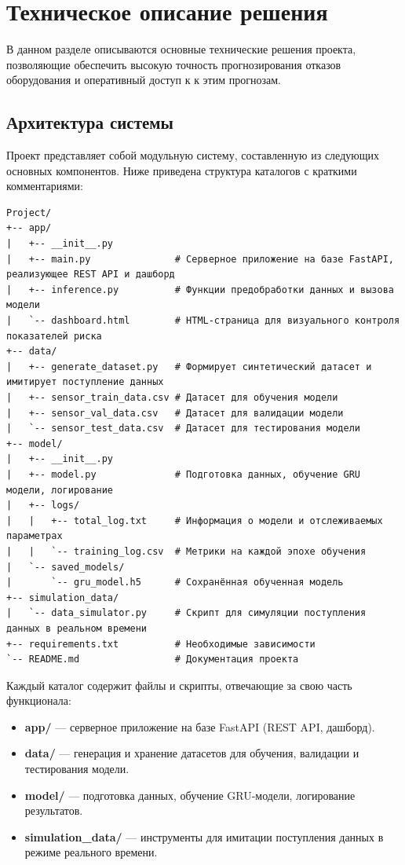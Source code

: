 \documentclass[a4paper,12pt]{article}
\begin{document}
\section{Техническое описание решения}
\begin{flushleft}

В данном разделе описываются основные технические решения проекта, позволяющие обеспечить высокую точность прогнозирования отказов оборудования и оперативный доступ к к этим прогнозам.

\subsection{Архитектура системы}
Проект представляет собой модульную систему, составленную из следующих основных компонентов. Ниже приведена структура каталогов с краткими комментариями:


\begin{lstlisting}
Project/
+-- app/
|   +-- __init__.py
|   +-- main.py               # Серверное приложение на базе FastAPI, реализующее REST API и дашборд
|   +-- inference.py          # Функции предобработки данных и вызова модели
|   `-- dashboard.html        # HTML-страница для визуального контроля показателей риска
+-- data/
|   +-- generate_dataset.py   # Формирует синтетический датасет и имитирует поступление данных
|   +-- sensor_train_data.csv # Датасет для обучения модели
|   +-- sensor_val_data.csv   # Датасет для валидации модели
|   `-- sensor_test_data.csv  # Датасет для тестирования модели
+-- model/
|   +-- __init__.py
|   +-- model.py              # Подготовка данных, обучение GRU модели, логирование
|   +-- logs/
|   |   +-- total_log.txt     # Информация о модели и отслеживаемых параметрах
|   |   `-- training_log.csv  # Метрики на каждой эпохе обучения
|   `-- saved_models/
|       `-- gru_model.h5      # Сохранённая обученная модель
+-- simulation_data/
|   `-- data_simulator.py     # Скрипт для симуляции поступления данных в реальном времени
+-- requirements.txt          # Необходимые зависимости
`-- README.md                 # Документация проекта
\end{lstlisting}


\noindent
Каждый каталог содержит файлы и скрипты, отвечающие за свою часть функционала:
\begin{itemize}
    \item \textbf{app/} --- серверное приложение на базе FastAPI (REST API, дашборд).
    \item \textbf{data/} --- генерация и хранение датасетов для обучения, валидации и тестирования модели.
    \item \textbf{model/} --- подготовка данных, обучение GRU-модели, логирование результатов.
    \item \textbf{simulation\_data/} --- инструменты для имитации поступления данных в режиме реального времени.
\end{itemize}



\end{flushleft}
\end{document}

